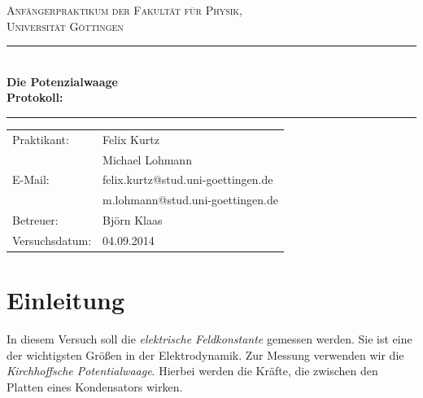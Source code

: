 \documentclass[12pt,a4paper,titlepage,headinclude,bibtotoc]{scrartcl}
\begin{document}
\begin{titlepage}
\centering
\textsc{\Large Anfängerpraktikum der Fakultät für
  Physik,\\[1.5ex] Universität Göttingen}

\vspace*{4.2cm}

\rule{\textwidth}{1pt}\\[0.5cm]
{\huge \bfseries
  Die Potenzialwaage\\[1.5ex]
  Protokoll:}\\[0.5cm]
\rule{\textwidth}{1pt}

\vspace*{3.0cm}

\begin{Large}
\begin{tabular}{ll}
Praktikant:
 	&  Felix Kurtz\\
 	&  Michael Lohmann\\

  E-Mail: 
	&  felix.kurtz@stud.uni-goettingen.de\\
	& m.lohmann@stud.uni-goettingen.de\\

 Betreuer: & Björn Klaas\\
 Versuchsdatum: & 04.09.2014\\
\end{tabular}
\end{Large}

\vspace*{0.8cm}

\begin{Large}
\end{Large}

\end{titlepage}

\tableofcontents

\newpage

\section{Einleitung}
\label{sec:einleitung}
In diesem Versuch soll die \textit{elektrische Feldkonstante} gemessen werden.
Sie ist eine der wichtigsten Größen in der Elektrodynamik.
Zur Messung verwenden wir die \textit{Kirchhoffsche Potentialwaage}.
Hierbei werden die Kräfte, die zwischen den Platten eines Kondensators wirken.
\end{document}

